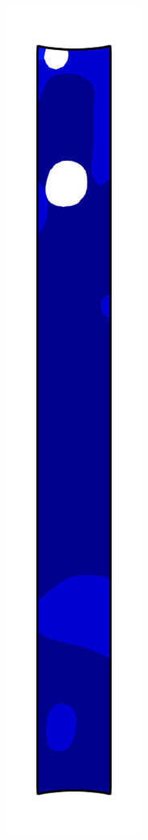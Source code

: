 \begin{figure}[!htb]
  \centering
  \begin{subfigure}{0.08\textwidth}
    \centering
    \includegraphics[width=\textwidth]{Chapter5/figures/spallation/psie_1}

\end{subfigure}
\end{figure}
